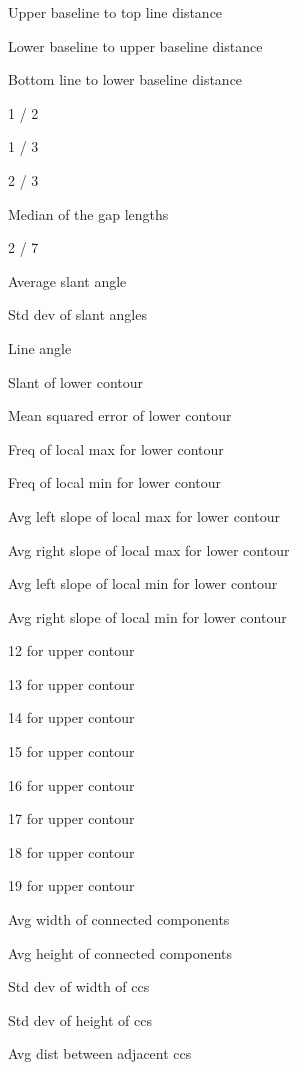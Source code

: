 \documentclass[paper=a4, fontsize=11pt]{scrartcl} %
\numberwithin{equation}{section} %
\numberwithin{figure}{section} %
\numberwithin{table}{section} %
\begin{document}
\begin{figure}
  \label{fig:featureList}
  \begin{multicols}{3}
    \begin{enumerate*}
    \item Upper baseline to top line distance
    \item Lower baseline to upper baseline distance
    \item Bottom line to lower baseline distance
    \item 1 / 2
    \item 1 / 3
    \item 2 / 3
    \item Median of the gap lengths
    \item 2 / 7
    \item Average slant angle
    \item Std dev of slant angles
    \item Line angle
    \item Slant of lower contour
    \item Mean squared error of lower contour
    \item Freq of local max for lower contour
    \item Freq of local min for lower contour
    \item Avg left slope of local max for lower contour
    \item Avg right slope of local max for lower contour
    \item Avg left slope of local min for lower contour
    \item Avg right slope of local min for lower contour
    \item 12 for upper contour
    \item 13 for upper contour
    \item 14 for upper contour
    \item 15 for upper contour
    \item 16 for upper contour
    \item 17 for upper contour
    \item 18 for upper contour
    \item 19 for upper contour
    \item Avg width of connected components
    \item Avg height of connected components
    \item Std dev of width of ccs
    \item Std dev of height of ccs
    \item Avg dist between adjacent ccs

\end{enumerate*}
\end{multicols}
\end{figure}
\end{document}
